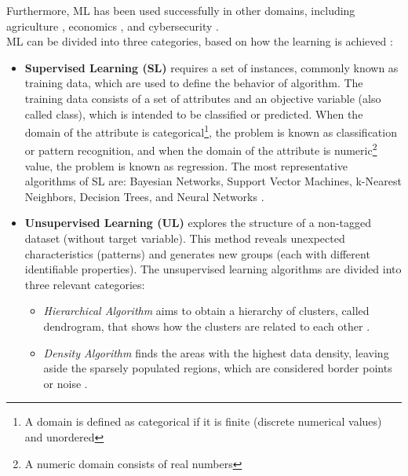 Furthermore, ML has been used successfully in other domains, including agriculture \cite{efcastillo_2016:agriculture, efcastillo_2015:agriculture, ZHANG_2005:agriculture}, economics \cite{kim_2004:usefulness, nielsen_2004:local}, and cybersecurity \cite{Dua_2011:DM_ML_Cybersecurity, Thuraisingham_2003:ciber}.\\

ML can be divided into three categories, based on how the learning is achieved \cite{ayodele_2010:introduction, bishop_2006:pattern_recognition}:

\begin{itemize}
    \item \textbf{Supervised Learning (SL)} requires a set of instances, commonly known as training data, which are used to define the behavior of algorithm. The training data consists of a set of attributes and an objective variable (also called class), which is intended to be classified or predicted. When the domain of the attribute is categorical\footnote{A domain is defined as categorical if it is finite (discrete numerical values) and unordered}, the problem is known as classification or pattern recognition, and when the domain of the attribute is numeric\footnote{A numeric domain consists of real numbers} value, the problem is known as regression. The most representative algorithms of SL are: Bayesian Networks, Support Vector Machines, k-Nearest Neighbors, Decision Trees, and Neural Networks \cite{Mowei_2017:ml_Workflow,Boutaba2018}.
    
    \item \textbf{Unsupervised Learning (UL)} explores the structure of a non-tagged dataset (without target variable). This method reveals unexpected characteristics (patterns) and generates new groups (each with different identifiable properties). The unsupervised learning algorithms are divided into three relevant categories: 
    
    \begin{itemize}
        \item \textit{Hierarchical Algorithm} aims to obtain a hierarchy of clusters, called dendrogram, that shows how the clusters are related to each other \cite{Grira_2004:ml_techniques}.
        
        \item \textit{Density Algorithm} finds the areas with the highest data density, leaving aside the sparsely populated regions, which are considered border points or noise \cite{rehman_2006:density_based_clustering}.
        

\end{itemize}
\end{itemize}
